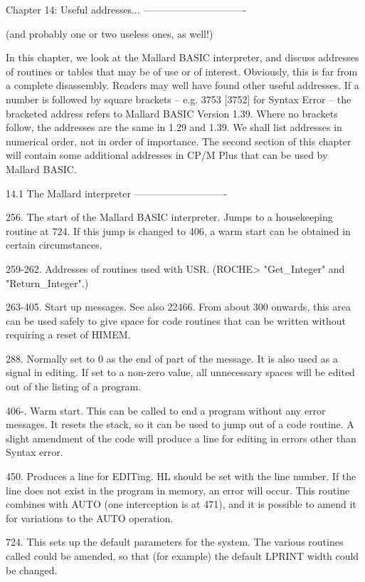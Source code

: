 Chapter 14: Useful addresses...
-------------------------------

(and probably one or two useless ones, as well!)

In  this  chapter,  we  look at the Mallard  BASIC  interpreter,  and  discuss 
addresses of routines or tables that may be of use or of interest.  Obviously, 
this  is  far from a complete disassembly. Readers may well have  found  other 
useful  addresses.  If a number is followed by square brackets  --  e.g.  3753 
[3752]  for  Syntax  Error -- the bracketed address refers  to  Mallard  BASIC 
Version 1.39. Where no brackets follow, the addresses are the same in 1.29 and 
1.39. We shall list addresses in numerical order, not in order of  importance. 
The  second section of this chapter will contain some additional addresses  in 
CP/M Plus that can be used by Mallard BASIC.


14.1 The Mallard interpreter
----------------------------

256.  The  start  of the Mallard BASIC interpreter. Jumps  to  a  housekeeping 
routine  at 724. If this jump is changed to 406, a warm start can be  obtained 
in certain circumstances.

259-262.  Addresses  of  routines used with  USR.  (ROCHE>  "Get_Integer"  and 
"Return_Integer".)

263-405. Start up messages. See also 22466. From about 300 onwards, this  area 
can be used safely to give space for code routines that can be written without 
requiring a reset of HIMEM.

288. Normally set to 0 as the end of part of the message. It is also used as a 
signal in editing. If set to a non-zero value, all unnecessary spaces will  be 
edited out of the listing of a program.

406-.  Warm  start.  This can be called to end a  program  without  any  error 
messages.  It  resets  the  stack, so it can be used to jump  out  of  a  code 
routine.  A  slight amendment of the code will produce a line for  editing  in 
errors other than Syntax error.

450.  Produces a line for EDITing. HL should be set with the line  number.  If 
the  line does not exist in the program in memory, an error will  occur.  This 
routine combines with AUTO (one interception is at 471), and it is possible to 
amend it for variations to the AUTO operation.

724. This sets up the default parameters for the system. The various  routines 
called could be amended, so that (for example) the default LPRINT width  could 
be changed.

